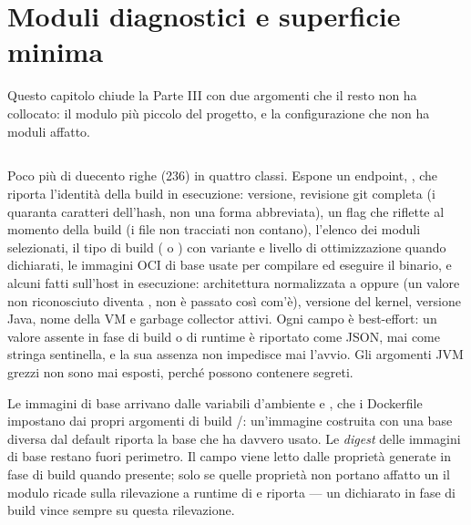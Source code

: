 \chapter{Moduli diagnostici e superficie minima}
\label{cap:16-moduli-diagnostici}

Questo capitolo chiude la Parte III con due argomenti che il resto non ha
collocato: il modulo pi\`u piccolo del progetto, e la configurazione che non ha
moduli affatto.

\section{}

Poco pi\`u di duecento righe (236) in quattro classi. Espone un endpoint,
, che riporta l'identit\`a della build in
esecuzione: versione, revisione git completa (i quaranta caratteri
dell'hash, non una forma abbreviata), un flag  che riflette
 al momento della build
(i file non tracciati non contano), l'elenco dei moduli selezionati, il tipo
di build ( o ) con variante e livello di
ottimizzazione quando dichiarati, le immagini OCI di base usate per compilare
ed eseguire il binario, e alcuni fatti sull'host in esecuzione: architettura
normalizzata a  oppure  (un valore non riconosciuto
diventa , non \`e passato cos\`i com'\`e), versione del kernel,
versione Java, nome della VM e garbage collector attivi. Ogni campo \`e
best-effort: un valore assente in fase di build o di runtime \`e riportato
come  JSON, mai come stringa sentinella, e la sua assenza non
impedisce mai l'avvio. Gli argomenti JVM grezzi non sono mai esposti, perch\'e
possono contenere segreti.

Le immagini di base arrivano dalle variabili d'ambiente
 e ,
che i Dockerfile impostano dai propri argomenti di build
/: un'immagine costruita con una
base diversa dal default riporta la base che ha davvero usato. Le
\emph{digest} delle immagini di base restano fuori perimetro. Il campo
 viene letto dalle propriet\`a generate in fase di build
quando presente; solo se quelle propriet\`a non portano affatto un
 il modulo ricade sulla rilevazione a runtime di
 e riporta  --- un
 dichiarato in fase di build vince sempre su questa rilevazione.

